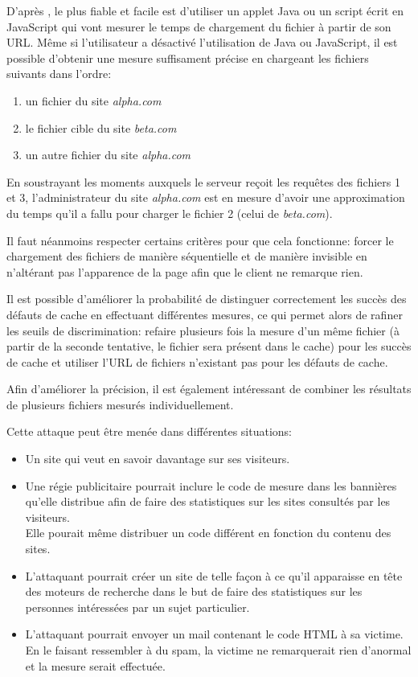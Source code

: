D'après \cite{Felten:2000:TAW:352600.352606}, le plus fiable et facile est d'utiliser un applet Java ou un script écrit en JavaScript qui vont mesurer le temps de chargement du fichier à partir de son URL. Même si l'utilisateur a désactivé l'utilisation de Java ou JavaScript, il est possible d'obtenir une mesure suffisament précise en chargeant les fichiers suivants dans l'ordre:

\begin{enumerate}
  \item un fichier du site \emph{alpha.com}
  \item le fichier cible du site \emph{beta.com}
  \item un autre fichier du site \emph{alpha.com}
\end{enumerate}

En soustrayant les moments auxquels le serveur reçoit les requêtes des fichiers 1 et 3, l'administrateur du site \emph{alpha.com} est en mesure d'avoir une approximation du temps qu'il a fallu pour charger le fichier 2 (celui de \emph{beta.com}).

Il faut néanmoins respecter certains critères pour que cela fonctionne: forcer le chargement des fichiers de manière séquentielle et de manière invisible en n'altérant pas l'apparence de la page afin que le client ne remarque rien.
\newline

Il est possible d'améliorer la probabilité de distinguer correctement les succès des défauts de cache en effectuant différentes mesures, ce qui permet alors de rafiner les seuils de discrimination: refaire plusieurs fois la mesure d'un même fichier (à partir de la seconde tentative, le fichier sera présent dans le cache) pour les succès de cache et utiliser l'URL de fichiers n'existant pas pour les défauts de cache.

Afin d'améliorer la précision, il est également intéressant de combiner les résultats de plusieurs fichiers mesurés individuellement.
\newline

Cette attaque peut être menée dans différentes situations:
\begin{itemize}
  \item Un site qui veut en savoir davantage sur ses visiteurs.
  \item Une régie publicitaire pourrait inclure le code de mesure dans les bannières qu'elle distribue afin de faire des statistiques sur les sites consultés par les visiteurs.\\Elle pourait même distribuer un code différent en fonction du contenu des sites.
  \item L'attaquant pourrait créer un site de telle façon à ce qu'il apparaisse en tête des moteurs de recherche dans le but de faire des statistiques sur les personnes intéressées par un sujet particulier.
  \item L'attaquant pourrait envoyer un mail contenant le code HTML à sa victime.\\En le faisant ressembler à du spam, la victime ne remarquerait rien d'anormal et la mesure serait effectuée.
\end{itemize}

